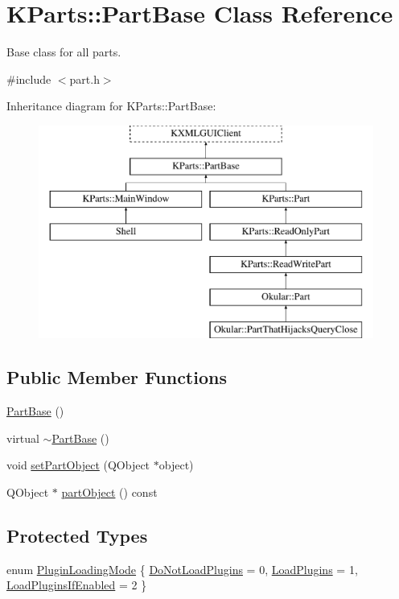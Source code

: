 \hypertarget{classKParts_1_1PartBase}{\section{K\+Parts\+:\+:Part\+Base Class Reference}
\label{classKParts_1_1PartBase}
}


Base class for all parts.  




{\ttfamily \#include $<$part.\+h$>$}

Inheritance diagram for K\+Parts\+:\+:Part\+Base\+:\begin{figure}[H]
\begin{center}
\leavevmode
\includegraphics[height=7.000000cm]{classKParts_1_1PartBase}
\end{center}
\end{figure}
\subsection*{Public Member Functions}
\begin{DoxyCompactItemize}
\item 
\hyperlink{classKParts_1_1PartBase_a24a84cc28a2f2c351d39c4128f2952a0}{Part\+Base} ()
\item 
virtual \hyperlink{classKParts_1_1PartBase_a0753290f4dd3c2886425e37594939ea8}{$\sim$\+Part\+Base} ()
\item 
void \hyperlink{classKParts_1_1PartBase_aea74884035b19b8909c3163ad6afd444}{set\+Part\+Object} (Q\+Object $\ast$object)
\item 
Q\+Object $\ast$ \hyperlink{classKParts_1_1PartBase_a259f6a9c7258d1a623b56782391ac7e6}{part\+Object} () const 
\end{DoxyCompactItemize}
\subsection*{Protected Types}
\begin{DoxyCompactItemize}
\item 
enum \hyperlink{classKParts_1_1PartBase_a73b04eba759c3505ac722b2ceaaa8b76}{Plugin\+Loading\+Mode} \{ \hyperlink{classKParts_1_1PartBase_a73b04eba759c3505ac722b2ceaaa8b76a3ffe0a5005d5e1d00b4d3fd8c4d51a1e}{Do\+Not\+Load\+Plugins} = 0, 
\hyperlink{classKParts_1_1PartBase_a73b04eba759c3505ac722b2ceaaa8b76aeff505f5627f1539e03730d042e39522}{Load\+Plugins} = 1, 
\hyperlink{classKParts_1_1PartBase_a73b04eba759c3505ac722b2ceaaa8b76aeaf6ca999ef635e22e3f52234226e931}{Load\+Plugins\+If\+Enabled} = 2
 \}
\end{DoxyCompactItemize}
